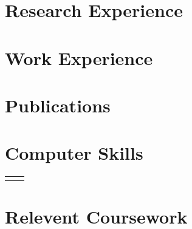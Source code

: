 \documentclass[10pt]{article} %
\begin{document}
\begin{paracol}{2}


% 


\medskip
\section{Research Experience}






\medskip
\section{Work Experience}




\switchcolumn
\medskip
\section{Publications}



\medskip
\section{Computer Skills} 

\begin{supertabular}{rl}
	
	

	
\end{supertabular}


\medskip
\section{Relevent Coursework}


\end{paracol}
\end{document}
